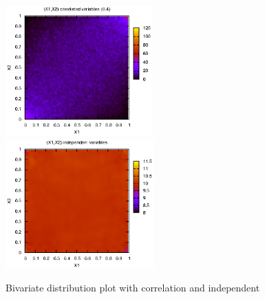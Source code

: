 \begin{figure}[!hb]
\begin{center}
\includegraphics[height=5cm, angle=0]{./images/copula.eps}
\includegraphics[height=5cm, angle=0]{./images/uniform.eps}
\caption{Bivariate distribution plot with correlation and independent}
\label{fig1}
\end{center}
\end{figure}

